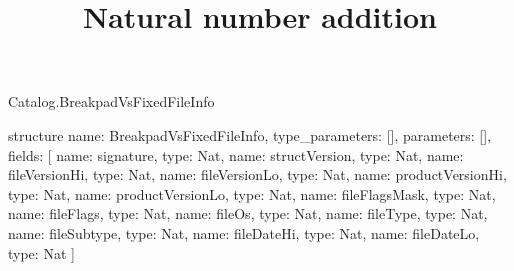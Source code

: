 \begin{lexlean}{Catalog.BreakpadVsFixedFileInfo}
\title{Natural number addition}
\begin{semanticmodule}
structure{
  name: BreakpadVsFixedFileInfo,
  type_parameters: [],
  parameters: [],
  fields: [
    {name: signature, type: Nat},
    {name: structVersion, type: Nat},
    {name: fileVersionHi, type: Nat},
    {name: fileVersionLo, type: Nat},
    {name: productVersionHi, type: Nat},
    {name: productVersionLo, type: Nat},
    {name: fileFlagsMask, type: Nat},
    {name: fileFlags, type: Nat},
    {name: fileOs, type: Nat},
    {name: fileType, type: Nat},
    {name: fileSubtype, type: Nat},
    {name: fileDateHi, type: Nat},
    {name: fileDateLo, type: Nat}
  ]
}
\end{semanticmodule}
\end{lexlean}
